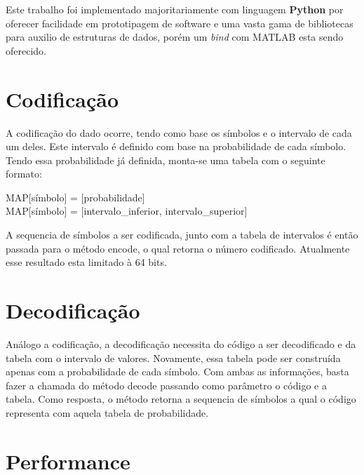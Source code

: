 Este trabalho foi implementado majoritariamente com linguagem \textbf{Python} por oferecer facilidade em prototipagem de software e uma vasta gama de bibliotecas para auxilio de estruturas de dados, porém um \textit{bind} com MATLAB esta sendo oferecido.

\section*{Codificação} %
\label{sub:codificação}

A codificação do dado ocorre, tendo como base os símbolos e o intervalo de cada um deles. Este intervalo é definido com base na probabilidade de cada símbolo. Tendo essa probabilidade já definida, monta-se uma tabela com o seguinte formato:

\begin{center}
{\ttfamily\footnotesize
    MAP[símbolo] = [probabilidade]\\
    MAP[símbolo] = [intervalo\_inferior, intervalo\_superior]
}
\end{center}

A sequencia de símbolos a ser codificada, junto com a tabela de intervalos é então passada para o método {\ttfamily encode}, o qual retorna o número codificado. Atualmente esse resultado esta limitado à 64 bits.

\section*{Decodificação} %
\label{sub:decodificação}
Análogo a codificação, a decodificação necessita do código a ser decodificado e da tabela com o intervalo de valores. Novamente, essa tabela pode ser construída apenas com a probabilidade de cada símbolo. Com ambas as informações, basta fazer a chamada do método {\ttfamily decode} passando como parâmetro o código e a tabela. Como resposta, o método retorna a sequencia de símbolos a qual o código representa com aquela tabela de probabilidade.

\section*{Performance} %
\label{sub:performance}

